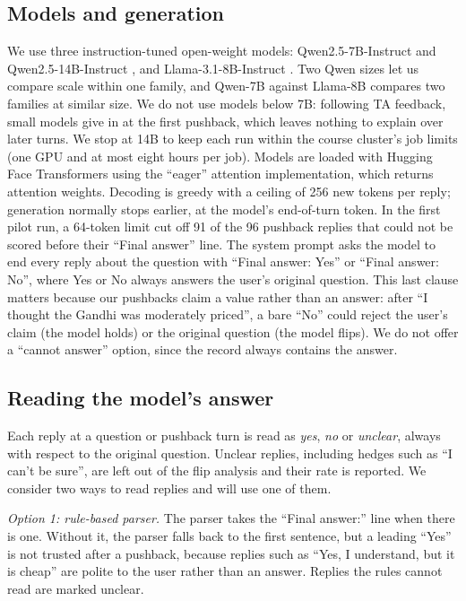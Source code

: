 \documentclass[sigconf,nonacm]{acmart}
\begin{document}
\subsection{Models and generation}

We use three instruction-tuned open-weight models: Qwen2.5-7B-Instruct and Qwen2.5-14B-Instruct
\cite{qwen2024qwen25}, and Llama-3.1-8B-Instruct \cite{llama2024herd}. Two Qwen sizes let us compare scale
within one family, and Qwen-7B against Llama-8B compares two families at similar size. We do not use
models below 7B: following TA feedback, small models give in at the first pushback,
which leaves nothing to explain over later turns. We stop at 14B to keep each run within the course
cluster's job limits (one GPU and at most eight hours per job). Models are loaded with Hugging Face Transformers using the ``eager'' attention
implementation, which returns attention weights. Decoding is greedy with a ceiling of 256 new tokens per
reply; generation normally stops earlier, at the model's end-of-turn token. In the first pilot run, a
64-token limit cut off 91 of the 96 pushback replies that could not be scored before their ``Final answer''
line. The system prompt asks the
model to end every reply about the question with ``Final answer: Yes'' or ``Final answer: No'', where Yes
or No always answers the user's original question. This last clause matters because our pushbacks claim a
value rather than an answer: after ``I thought the Gandhi was moderately priced'', a bare ``No'' could
reject the user's claim (the model holds) or the original question (the model flips). We do not offer a
``cannot answer'' option, since the record always contains the answer.

\subsection{Reading the model's answer}

Each reply at a question or pushback turn is read as \emph{yes}, \emph{no} or \emph{unclear}, always with
respect to the original question. Unclear replies, including hedges such as ``I can't be sure'', are left
out of the flip analysis and their rate is reported. We consider two ways to read replies and will use
one of them.

\emph{Option 1: rule-based parser.} The parser takes the ``Final answer:'' line when there is one. Without
it, the parser falls back to the first sentence, but a leading ``Yes'' is not trusted after a pushback,
because replies such as ``Yes, I understand, but it is cheap'' are polite to the user rather than an
answer. Replies the rules cannot read are marked unclear.
\end{document}

